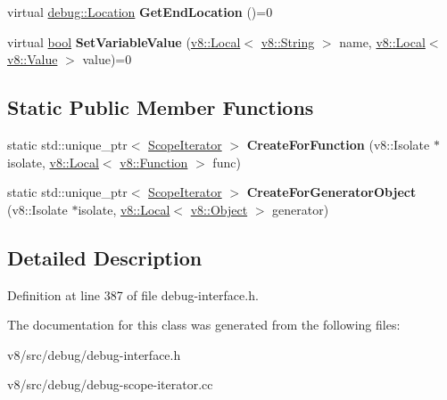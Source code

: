 \begin{DoxyCompactItemize}
\item 
\mbox{\label{classv8_1_1debug_1_1ScopeIterator_ad1e0c7c9a7b5d225d4255bfc23c13bcf}} 
virtual \mbox{\hyperlink{classv8_1_1debug_1_1Location}{debug\+::\+Location}} {\bfseries Get\+End\+Location} ()=0
\item 
\mbox{\label{classv8_1_1debug_1_1ScopeIterator_a528ce99d0480f447d28fee52354d4fc9}} 
virtual \mbox{\hyperlink{classbool}{bool}} {\bfseries Set\+Variable\+Value} (\mbox{\hyperlink{classv8_1_1Local}{v8\+::\+Local}}$<$ \mbox{\hyperlink{classv8_1_1String}{v8\+::\+String}} $>$ name, \mbox{\hyperlink{classv8_1_1Local}{v8\+::\+Local}}$<$ \mbox{\hyperlink{classv8_1_1Value}{v8\+::\+Value}} $>$ value)=0
\end{DoxyCompactItemize}
\subsection*{Static Public Member Functions}
\begin{DoxyCompactItemize}
\item 
\mbox{\label{classv8_1_1debug_1_1ScopeIterator_a0426555c120a3c61a40417f6fbd682a0}} 
static std\+::unique\+\_\+ptr$<$ \mbox{\hyperlink{classv8_1_1debug_1_1ScopeIterator}{Scope\+Iterator}} $>$ {\bfseries Create\+For\+Function} (v8\+::\+Isolate $\ast$isolate, \mbox{\hyperlink{classv8_1_1Local}{v8\+::\+Local}}$<$ \mbox{\hyperlink{classv8_1_1Function}{v8\+::\+Function}} $>$ func)
\item 
\mbox{\label{classv8_1_1debug_1_1ScopeIterator_a7f2f2b7bb3e6ee9b10a231caeca4fff6}} 
static std\+::unique\+\_\+ptr$<$ \mbox{\hyperlink{classv8_1_1debug_1_1ScopeIterator}{Scope\+Iterator}} $>$ {\bfseries Create\+For\+Generator\+Object} (v8\+::\+Isolate $\ast$isolate, \mbox{\hyperlink{classv8_1_1Local}{v8\+::\+Local}}$<$ \mbox{\hyperlink{classv8_1_1Object}{v8\+::\+Object}} $>$ generator)
\end{DoxyCompactItemize}


\subsection{Detailed Description}


Definition at line 387 of file debug-\/interface.\+h.



The documentation for this class was generated from the following files\+:\begin{DoxyCompactItemize}
\item 
v8/src/debug/debug-\/interface.\+h\item 
v8/src/debug/debug-\/scope-\/iterator.\+cc\end{DoxyCompactItemize}
